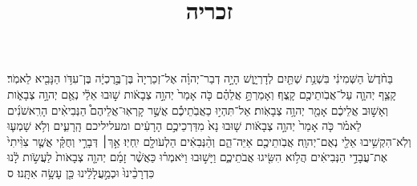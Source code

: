 \documentclass{openreader}
\title{זכריה}
\date{}
\begin{document}
\maketitle
\raggedbottom 
\fontsize{16pt}{24pt}\selectfont


בַּחֹ֨דֶשׁ֙ הַשְּׁמִינִ֔י בִּשְׁנַ֥ת שְׁתַּ֖יִם לְדָרְיָ֑וֶשׁ הָיָ֣ה דְבַר־יְהוָ֗ה אֶל־זְכַרְיָה֙ בֶּן־בֶּ֣רֶכְיָ֔ה בֶּן־עִדֹּ֥ו הַנָּבִ֖יא לֵאמֹֽר׃ 
קָצַ֧ף יְהוָ֛ה עַל־אֲבֹֽותֵיכֶ֖ם קָֽצֶף׃ 
וְאָמַרְתָּ֣ אֲלֵהֶ֗ם כֹּ֤ה אָמַר֙ יְהוָ֣ה צְבָאֹ֔ות שׁ֣וּבוּ אֵלַ֔י נְאֻ֖ם יְהוָ֣ה צְבָאֹ֑ות וְאָשׁ֣וּב אֲלֵיכֶ֔ם אָמַ֖ר יְהוָ֥ה צְבָאֹֽות׃ 
אַל־תִּהְי֣וּ כַאֲבֹֽתֵיכֶ֡ם אֲשֶׁ֣ר קָרְאֽוּ־אֲלֵיהֶם֩ הַנְּבִיאִ֨ים הָרִֽאשֹׁנִ֜ים לֵאמֹ֗ר כֹּ֤ה אָמַר֙ יְהוָ֣ה צְבָאֹ֔ות שׁ֤וּבוּ נָא֙ מִדַּרְכֵיכֶ֣ם הָרָעִ֔ים ומעליליכם הָֽרָעִ֑ים וְלֹ֥א שָׁמְע֛וּ וְלֹֽא־הִקְשִׁ֥יבוּ אֵלַ֖י נְאֻם־יְהוָֽה׃ 
אֲבֹֽותֵיכֶ֖ם אַיֵּה־הֵ֑ם וְהַ֨נְּבִאִ֔ים הַלְעֹולָ֖ם יִֽחְיֽוּ׃ 
אַ֣ךְ׀ דְּבָרַ֣י וְחֻקַּ֗י אֲשֶׁ֤ר צִוִּ֨יתִי֙ אֶת־עֲבָדַ֣י הַנְּבִיאִ֔ים הֲלֹ֥וא הִשִּׂ֖יגוּ אֲבֹתֵיכֶ֑ם וַיָּשׁ֣וּבוּ וַיֹּאמְר֗וּ כַּאֲשֶׁ֨ר זָמַ֜ם יְהוָ֤ה צְבָאֹות֙ לַעֲשֹׂ֣ות לָ֔נוּ כִּדְרָכֵ֨ינוּ֙ וּכְמַ֣עֲלָלֵ֔ינוּ כֵּ֖ן עָשָׂ֥ה אִתָּֽנוּ׃ ס 
\end{document}
